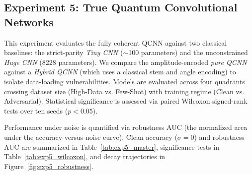 
\subsection{Experiment 5: True Quantum Convolutional Networks}
\label{sec:exp5_results}

This experiment evaluates the fully coherent QCNN against two classical baselines: the strict-parity \emph{Tiny CNN} ($\sim$100 parameters) and the unconstrained \emph{Huge CNN} (8228 parameters). We compare the amplitude-encoded \emph{pure QCNN} against a \emph{Hybrid QCNN} (which uses a classical stem and angle encoding) to isolate data-loading vulnerabilities. Models are evaluated across four quadrants crossing dataset size (High-Data vs. Few-Shot) with training regime (Clean vs. Adversarial). Statistical significance is assessed via paired Wilcoxon signed-rank tests over ten seeds ($p<0.05$).

Performance under noise is quantified via robustness AUC (the normalized area under the accuracy-versus-noise curve). Clean accuracy ($\sigma=0$) and robustness AUC are summarized in Table~\ref{tab:exp5_master}, significance tests in Table~\ref{tab:exp5_wilcoxon}, and decay trajectories in Figure~\ref{fig:exp5_robustness}.

